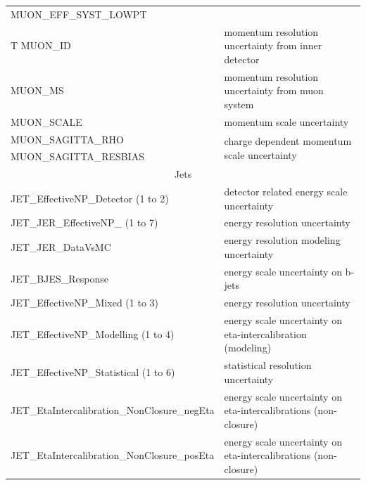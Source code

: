 \begin{table}
{\begin{tabular}{l|l}
  MUON\_EFF\_SYST\_LOWPT         &                                                                      \\
T%
  MUON\_ID                       & momentum resolution uncertainty from inner detector                  \\
  MUON\_MS                       & momentum resolution uncertainty from muon system                     \\
  MUON\_SCALE                    & momentum scale uncertainty                                           \\
  MUON\_SAGITTA\_RHO             & \multirow{2}{*}{charge dependent momentum scale uncertainty}         \\
  MUON\_SAGITTA\_RESBIAS         &                                                                      \\
  \hline
  \multicolumn{2}{c}{Jets}\\
  \hline         
  JET\_EffectiveNP\_Detector (1 to 2) & detector related energy scale uncertainty \\
  JET\_JER\_EffectiveNP\_ (1 to 7) & energy resolution uncertainty  \\
  JET\_JER\_DataVsMC 	& energy resolution modeling uncertainty \\
  JET\_BJES\_Response & energy scale uncertainty on b-jets \\
  JET\_EffectiveNP\_Mixed (1 to 3) & energy resolution uncertainty \\
  JET\_EffectiveNP\_Modelling (1 to 4) &  energy scale uncertainty on eta-intercalibration (modeling) \\
  JET\_EffectiveNP\_Statistical (1 to 6) &  statistical resolution uncertainty \\
  JET\_EtaIntercalibration\_NonClosure\_negEta &  energy scale uncertainty on eta-intercalibrations (non-closure) \\
  JET\_EtaIntercalibration\_NonClosure\_posEta & energy scale uncertainty on eta-intercalibrations (non-closure) \\

\end{tabular}}
\end{table}
